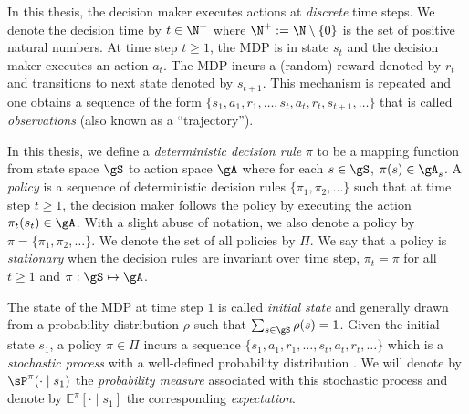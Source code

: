 In this thesis, the decision maker executes actions at \emph{discrete} time steps.
We denote the decision time by $t\in\N^+$ where $\N^+:=\N\setminus\{0\}$ is the set of positive natural numbers.
At time step $t\ge1$, the MDP is in state $s_t$ and the decision maker executes an action $a_t$.
The MDP incurs a (random) reward denoted by $r_t$ and transitions to next state denoted by $s_{t+1}$.
This mechanism is repeated and one obtains a sequence of the form $\{s_1,a_1,r_1,\dots,s_t,a_t,r_t,s_{t+1},\dots\}$ that is called \emph{observations} (also known as a ``trajectory'').

In this thesis, we define a \emph{deterministic decision rule} $\pi$ to be a mapping function from state space $\gS$ to action space $\gA$ where for each $s\in\gS$, $\pi(s)\in\gA_s$.
A \emph{policy} is a sequence of deterministic decision rules $\{\pi_1,\pi_2,\dots\}$ such that at time step $t\ge1$, the decision maker follows the policy by executing the action $\pi_t(s_t)\in\gA$.
With a slight abuse of notation, we also denote a policy by $\pi=\{\pi_1,\pi_2,\dots\}$.
We denote the set of all policies by $\Pi$.
We say that a policy is \emph{stationary} when the decision rules are invariant over time step, $\pi_t=\pi$ for all $t\ge1$ and $\pi:\gS\mapsto\gA$.

The state of the MDP at time step $1$ is called \emph{initial state} and generally drawn from a probability distribution $\rho$ such that $\sum_{s\in\gS}\rho(s)=1$.
Given the initial state $s_1$, a policy $\pi\in\Pi$ incurs a sequence $\{s_1,a_1,r_1,\dots,s_t,a_t,r_t,\dots\}$ which is a \emph{stochastic process} with a well-defined probability distribution \cite[Section~2.1.6]{puterman2014markov}.
We will denote by $\sP^\pi(\cdot\mid s_1)$ the \emph{probability measure} associated with this stochastic process and denote by $\mathbb{E}^\pi[\cdot \mid s_1]$ the corresponding \emph{expectation}.

